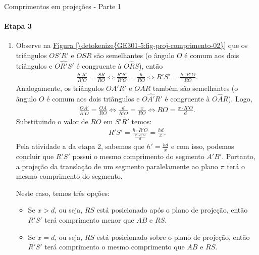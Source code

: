 \begin{answer}{Comprimentos em projeções - Parte 1}
{
\paragraph{Etapa 3}
\begin{enumerate}
\item 

Observe na \hyperref[\detokenize{GE301-5:fig-proj-comprimento-02}]{Figura \ref{\detokenize{GE301-5:fig-proj-comprimento-02}}} que os triângulos \(OS'R'\) e \(OSR\) são semelhantes (o ângulo \(O\) é comum aos dois triângulos e \(O\hat{R'}S'\) é congruente à \(O\hat{R}S\)), então
\begin{equation*}
\begin{split}\frac{S'R'}{R'O} = \frac{SR}{RO}  \Longleftrightarrow \frac{R'S'}{R'O} = \frac{h}{RO} \Longleftrightarrow R'S'= \frac{h \cdot R'O}{RO}.\end{split}
\end{equation*}
Analogamente, os triângulos \(OA'R'\) e \(OAR\) também são semelhantes (o ângulo \(O\) é comum aos dois triângulos e \(O\hat{A'}R'\) é congruente à \(O\hat{A}R\)). Logo,
\begin{equation*}
\begin{split}\frac{OA'}{R'O} = \frac{OA}{RO}  \Longleftrightarrow \frac{d}{R'O} = \frac{x}{RO} \Longleftrightarrow RO = \frac{x \cdot R'O}{d}.\end{split}
\end{equation*}
Substituindo o valor de \(RO\) em \(S'R'\) temos:
\begin{equation*}
\begin{split}R'S'= \frac{h \cdot R'O}{\frac{x \cdot R'O}{d}} = \frac{hd}{x}.\end{split}
\end{equation*}
Pela atividade a da etapa 2, sabemos que \(h'=\frac{hd}{x}\) e com isso, podemos concluir que \(R'S'\) possui o mesmo comprimento do segmento \(A'B'\). Portanto, a projeção da translação de um segmento paralelamente ao plano \(\pi\) terá o mesmo comprimento do segmento.

Neste caso, temos três opções:
\begin{itemize}
\item {} 
Se \(x>d\), ou seja, \(RS\) está posicionado após o plano de projeção, então \(R'S'\) terá comprimento menor que \(AB\) e \(RS\).

\item {} 
Se \(x=d\), ou seja, \(RS\) está posicionado sobre o plano de projeção, então \(R'S'\) terá comprimento o mesmo comprimento que \(AB\) e \(RS\).


\end{itemize}
\end{enumerate}}
\end{answer}
